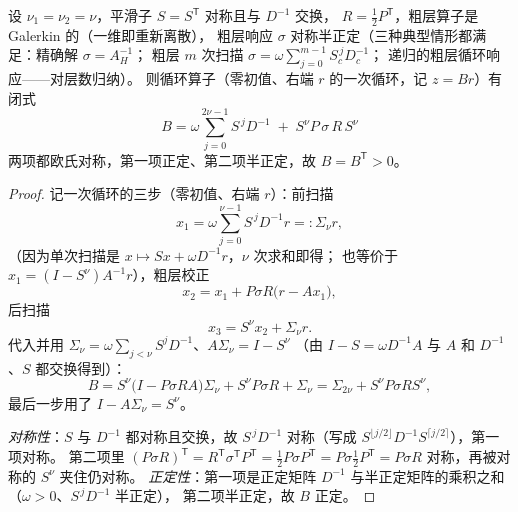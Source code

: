 \begin{theorem}[对称循环算子是对称正定的]
\label{thm:mg-cycle-spd}
设 $\nu_1=\nu_2=\nu$，平滑子 $S=S^{\mathsf T}$ 对称且与 $D^{-1}$ 交换，
$R=\frac12P^{\mathsf T}$，粗层算子是 Galerkin 的（一维即重新离散），
粗层响应 $\sigma$ 对称半正定（三种典型情形都满足：精确解 $\sigma=A_H^{-1}$；
粗层 $m$ 次扫描 $\sigma=\omega\sum_{j=0}^{m-1}S_{\!c}^{\,j}D_c^{-1}$；
递归的粗层循环响应——对层数归纳）。
则循环算子（零初值、右端 $r$ 的一次循环，记 $z=Br$）有闭式
\begin{equation}
  \boxed{\;B=\omega\sum_{j=0}^{2\nu-1}S^{\,j}D^{-1}\;+\;S^{\nu}P\,\sigma\,R\,S^{\nu}\;}
  \label{eq:mg-B-closed}
\end{equation}
两项都欧氏对称，第一项正定、第二项半正定，故 $B=B^{\mathsf T}>0$。
\end{theorem}

\begin{proof}
记一次循环的三步（零初值、右端 $r$）：前扫描
\begin{equation}
  x_1=\omega\sum_{j=0}^{\nu-1}S^{\,j}D^{-1}r=:\Sigma_\nu r,
\end{equation}
（因为单次扫描是 $x\mapsto Sx+\omega D^{-1}r$，$\nu$ 次求和即得；
也等价于 $x_1=(I-S^{\nu})A^{-1}r$），粗层校正
\begin{equation}
  x_2=x_1+P\sigma R\bigl(r-Ax_1\bigr),
\end{equation}
后扫描
\begin{equation}
  x_3=S^{\nu}x_2+\Sigma_\nu r .
\end{equation}
代入并用 $\Sigma_\nu=\omega\sum_{j<\nu}S^jD^{-1}$、$A\Sigma_\nu=I-S^{\nu}$
（由 $I-S=\omega D^{-1}A$ 与 $A$ 和 $D^{-1}$、$S$ 都交换得到）：
\begin{equation}
  B=S^{\nu}\bigl(I-P\sigma RA\bigr)\Sigma_\nu+S^{\nu}P\sigma R+\Sigma_\nu
  =\Sigma_{2\nu}+S^{\nu}P\sigma RS^{\nu},
\end{equation}
最后一步用了 $I-A\Sigma_\nu=S^{\nu}$。

\emph{对称性}：$S$ 与 $D^{-1}$ 都对称且交换，故 $S^{\,j}D^{-1}$ 对称（写成
$S^{\lfloor j/2\rfloor}D^{-1}S^{\lceil j/2\rceil}$），第一项对称。
第二项里 $(P\sigma R)^{\mathsf T}=R^{\mathsf T}\sigma^{\mathsf T}P^{\mathsf T}
=\frac12P\sigma P^{\mathsf T}=P\sigma\frac12P^{\mathsf T}=P\sigma R$ 对称，再被对称的 $S^{\nu}$ 夹住仍对称。
\emph{正定性}：第一项是正定矩阵 $D^{-1}$ 与半正定矩阵的乘积之和（$\omega>0$、$S^{\,j}D^{-1}$ 半正定），
第二项半正定，故 $B$ 正定。
\end{proof}

